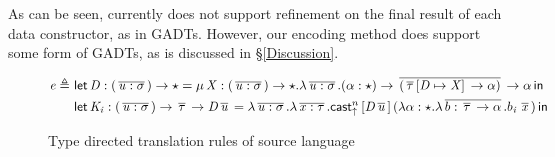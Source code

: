As can be seen, currently \sufcc does not support refinement on the
final result of each data constructor, as in GADTs. However, our
encoding method does support some form of GADTs, as is discussed in
\S\ref{Discussion}.

\begin{figure*}
\ottdefnctxtrans{}
\ottdefnpgmtrans{}
\ottdefndecltrans{}
\begin{align*}
\mathit{e}  \triangleq ~  &  \mathsf{let} \, \mathit{D}  :  (  \,\overline{  \mathit{u}  :  \sigma  }\,  )  \rightarrow  \star  =  \mu \, \mathit{X}  :  (  \,\overline{  \mathit{u}  :  \sigma  }\,  )  \rightarrow  \star  .  \lambda  \,\overline{  \mathit{u}  :  \sigma  }\,  .  (  \alpha  :  \star  )  \rightarrow  \,\overline{  (  \,\overline{  \tau  }\,  [  \mathit{D}  \mapsto  \mathit{X}  ] \,  \rightarrow  \alpha  )  }\,  \rightarrow  \alpha \, \mathsf{in} \, \\ &  \mathsf{let} \, \mathit{K_{\mathit{i}}}  :  (  \,\overline{  \mathit{u}  :  \sigma  }\,  )  \rightarrow  \,\overline{  \tau  }\,  \rightarrow  \mathit{D}    \,\overline{  \mathit{u}  }\,  =  \lambda  \,\overline{  \mathit{u}  :  \sigma  }\,  .  \lambda  \,\overline{  \mathit{x}  :  \tau  }\,  .  \mathsf{cast}_{\uparrow}^n \, [  \mathit{D}    \,\overline{  \mathit{u}  }\,  ] \,  (  \lambda  \alpha  :  \star  .  \lambda  \,\overline{  b  :  \,\overline{  \tau  }\,  \rightarrow  \alpha  }\,  .  b_{\mathit{i}} \, \,\overline{  \mathit{x}  }\,  ) \, \mathsf{in} \, 
\end{align*}
\ottdefnpattrans{}
\ottdefnexprtrans{}
\caption{Type directed translation rules of source language}
\label{fig:source:translate}
\end{figure*}




